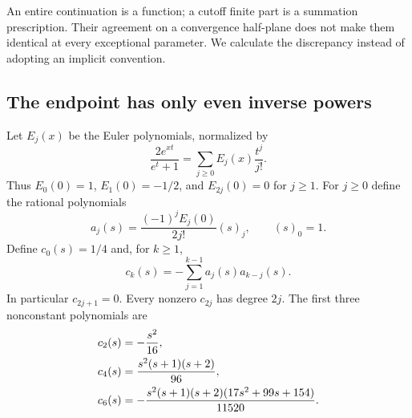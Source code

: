 \documentclass[11pt]{article}
\theoremstyle{definition}
\theoremstyle{remark}
\numberwithin{equation}{section}
\begin{document}
An entire continuation is a function; a cutoff finite part is a summation
prescription. Their agreement on a convergence half-plane does not make
them identical at every exceptional parameter. We calculate the discrepancy
instead of adopting an implicit convention.

\subsection{The endpoint has only even inverse powers}

Let $E_j(x)$ be the Euler polynomials, normalized by
\begin{equation}\label{cut:Euler}
 \frac{2e^{xt}}{e^t+1}=\sum_{j\ge0}E_j(x)\frac{t^j}{j!}.
\end{equation}
Thus $E_0(0)=1$, $E_1(0)=-1/2$, and $E_{2j}(0)=0$ for $j\ge1$.
For $j\ge0$ define the rational polynomials
\begin{equation}\label{cut:a}
 a_j(s)=\frac{(-1)^jE_j(0)}{2j!}(s)_j,
 \qquad (s)_0=1.
\end{equation}
Define $c_0(s)=1/4$ and, for $k\ge1$,
\begin{equation}\label{cut:c}
 c_k(s)=-\sum_{j=1}^{k-1}a_j(s)a_{k-j}(s).
\end{equation}
In particular $c_{2j+1}=0$. Every nonzero $c_{2j}$ has degree $2j$.
The first three nonconstant polynomials are
\begin{align}
 c_2(s)&=-\frac{s^2}{16},\label{cut:firstc}\\
 c_4(s)&=\frac{s^2(s+1)(s+2)}{96},\notag\\
 c_6(s)&=-\frac{s^2(s+1)(s+2)(17s^2+99s+154)}{11520}.\notag
\end{align}
\end{document}
